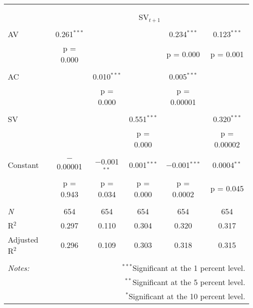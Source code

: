 
\begin{tabular}{@{\extracolsep{5pt}}lccccc} 
\\[-1.8ex]\hline 
\hline \\[-1.8ex] 
\\[-1.8ex] & \multicolumn{5}{c}{SV$_{t+1}$} \\ 
\hline \\[-1.8ex] 
 AV & 0.261$^{***}$ &  &  & 0.234$^{***}$ & 0.123$^{***}$ \\ 
  & p = 0.000 &  &  & p = 0.000 & p = 0.001 \\ 
  & & & & & \\ 
 AC &  & 0.010$^{***}$ &  & 0.005$^{***}$ &  \\ 
  &  & p = 0.000 &  & p = 0.00001 &  \\ 
  & & & & & \\ 
 SV &  &  & 0.551$^{***}$ &  & 0.320$^{***}$ \\ 
  &  &  & p = 0.000 &  & p = 0.00002 \\ 
  & & & & & \\ 
 Constant & $-$0.00001 & $-$0.001$^{**}$ & 0.001$^{***}$ & $-$0.001$^{***}$ & 0.0004$^{**}$ \\ 
  & p = 0.943 & p = 0.034 & p = 0.000 & p = 0.0002 & p = 0.045 \\ 
  & & & & & \\ 
\textit{N} & 654 & 654 & 654 & 654 & 654 \\ 
R$^{2}$ & 0.297 & 0.110 & 0.304 & 0.320 & 0.317 \\ 
Adjusted R$^{2}$ & 0.296 & 0.109 & 0.303 & 0.318 & 0.315 \\ 
\hline 
\hline \\[-1.8ex] 
\textit{Notes:} & \multicolumn{5}{r}{$^{***}$Significant at the 1 percent level.} \\ 
 & \multicolumn{5}{r}{$^{**}$Significant at the 5 percent level.} \\ 
 & \multicolumn{5}{r}{$^{*}$Significant at the 10 percent level.} \\ 
\end{tabular} 
